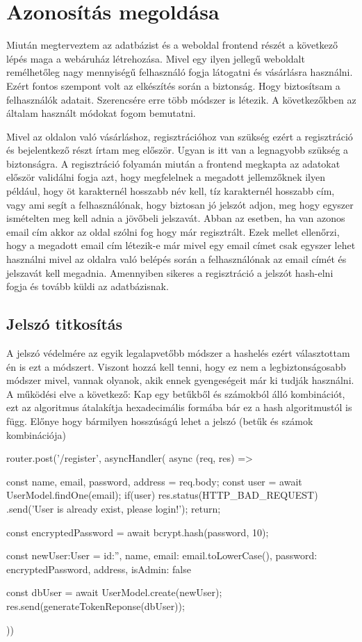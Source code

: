 \section{Azonosítás megoldása}
Miután megterveztem az adatbázist és a weboldal frontend részét a következő lépés maga a webáruház létrehozása. Mivel egy ilyen jellegű weboldalt remélhetőleg nagy mennyiségű felhasználó fogja látogatni és vásárlásra használni. Ezért fontos szempont volt az elkészítés során a biztonság. Hogy biztosítsam a felhasználók adatait. Szerencsére erre több módszer is létezik. A következőkben az általam használt módokat fogom bemutatni.

Mivel az oldalon való vásárláshoz, regisztrációhoz van szükség ezért a regisztráció és bejelentkező részt írtam meg először. Ugyan is itt van a legnagyobb szükség a biztonságra. A regisztráció folyamán miután a frontend megkapta az adatokat először validálni fogja azt, hogy megfelelnek a megadott jellemzőknek ilyen például, hogy öt karakternél hosszabb név kell, tíz karakternél hosszabb cím, vagy ami segít a felhasználónak, hogy biztosan jó jelszót adjon, meg hogy egyszer ismételten meg kell adnia a jövőbeli jelszavát. Abban az esetben, ha van azonos email cím akkor az oldal szólni fog hogy már regisztrált. Ezek mellet ellenőrzi, hogy a megadott email cím létezik-e már mivel egy email címet csak egyszer lehet használni mivel az oldalra való belépés során a felhasználónak az email címét és jelszavát kell megadnia. Amennyiben sikeres a regisztráció a jelszót hash-elni fogja és tovább küldi az adatbázisnak. 

\subsection{Jelszó titkosítás}
A jelszó védelmére az egyik legalapvetőbb módszer a hashelés ezért választottam én is ezt a módszert. Viszont hozzá kell tenni, hogy ez nem a legbiztonságosabb módszer mivel, vannak olyanok, akik ennek gyengeségeit már ki tudják használni. A működési elve a következő: Kap egy betűkből és számokból álló kombinációt, ezt az algoritmus átalakítja hexadecimális formába bár ez a hash algoritmustól is függ. Előnye hogy bármilyen hosszúságú lehet a jelszó (betűk és számok kombinációja)

\newpage

\begin{python}[caption={Regisztráció},captionpos=b]
  router.post('/register', asyncHandler(
  async (req, res) => {
    const {name, email, password, address} = req.body;
    const user = await UserModel.findOne({email});
    if(user){
      res.status(HTTP_BAD_REQUEST)
      .send('User is already exist, please login!');
      return;
    }

    const encryptedPassword = await bcrypt.hash(password, 10);

    const newUser:User = {
      id:'',
      name,
      email: email.toLowerCase(),
      password: encryptedPassword,
      address,
      isAdmin: false
    }

    const dbUser = await UserModel.create(newUser);
    res.send(generateTokenReponse(dbUser));
  }
))
\end{python}

